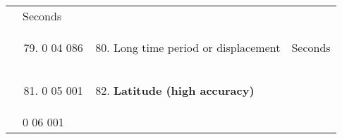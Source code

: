 \begin{longtable}[]{@{}llll@{}}
\begin{minipage}[t]{0.22\columnwidth}
\end{minipage} & \begin{minipage}[t]{0.22\columnwidth}\raggedright
Seconds\strut
\end{minipage}\tabularnewline
\begin{minipage}[t]{0.22\columnwidth}\raggedright
\strut
\end{minipage} & \begin{minipage}[t]{0.22\columnwidth}\raggedright
\begin{enumerate}
\setcounter{enumi}{78}
\item
  0 04 086
\end{enumerate}\strut
\end{minipage} & \begin{minipage}[t]{0.22\columnwidth}\raggedright
\begin{enumerate}
\setcounter{enumi}{79}
\item
  Long time period or displacement
\end{enumerate}\strut
\end{minipage} & \begin{minipage}[t]{0.22\columnwidth}\raggedright
Seconds\strut
\end{minipage}\tabularnewline
\begin{minipage}[t]{0.22\columnwidth}\raggedright
\strut
\end{minipage} & \begin{minipage}[t]{0.22\columnwidth}\raggedright
\begin{enumerate}
\setcounter{enumi}{80}
\item
  0 05 001
\end{enumerate}\strut
\end{minipage} & \begin{minipage}[t]{0.22\columnwidth}\raggedright
\begin{enumerate}
\setcounter{enumi}{81}
\item
  \textbf{Latitude (high accuracy)}
\end{enumerate}\strut
\end{minipage} & \begin{minipage}[t]{0.22\columnwidth}\raggedright
\strut
\end{minipage}\tabularnewline
\begin{minipage}[t]{0.22\columnwidth}\raggedright
\strut
\end{minipage} & \begin{minipage}[t]{0.22\columnwidth}\raggedright
0 06 001\strut
\end{minipage} & \begin{minipage}[t]{0.22\columnwidth}\raggedright

\end{minipage}
\end{longtable}
